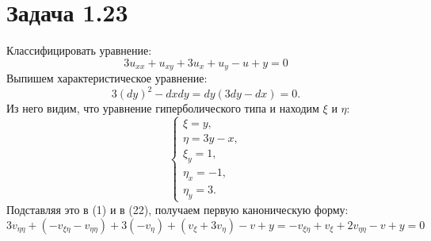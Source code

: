\documentclass[11pt]{article}
\begin{document}
\section{Задача 1.23}
\label{sec:org453389b}
Классифицировать уравнение:
\begin{equation}
3u_{xx} + u_{xy} + 3u_x + u_y - u + y = 0
\end{equation}
Выпишем характеристическое уравнение:
\begin{equation}
3(dy)^2 - dxdy = dy(3dy - dx) = 0.
\end{equation}
Из него видим, что уравнение гиперболического типа и находим $\xi$ и $\eta$:
\begin{equation}
\begin{cases}
\xi = y, \\
\eta = 3y - x, \\
\xi_y = 1, \\
\eta_x = -1, \\
\eta_y = 3.
\end{cases}
\end{equation}
Подставляя это в (1) и в (22), получаем первую каноническую форму:
\begin{equation}
3v_{\eta\eta} + (-v_{\xi\eta} - v_{\eta\eta}) + 3(-v_{\eta}) + (v_{\xi} + 3v_{\eta}) - v + y =
-v_{\xi\eta} + v_{\xi} + 2v_{\eta\eta} - v + y = 0
\end{equation}
\end{document}

